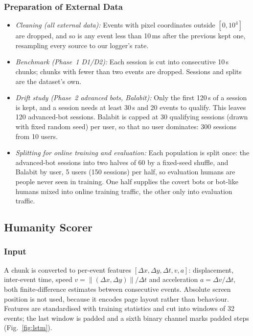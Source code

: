 \documentclass{ieeetj}
\begin{document}
\subsubsection{Preparation of External Data}
\begin{itemize}[leftmargin=*, itemsep=1pt]
\item \emph{Cleaning (all external data):} Events with pixel coordinates outside $[0,10^4]$ are dropped, and so is any event less than 10\,ms after the previous kept one, resampling every source to our logger's rate.
\item \emph{Benchmark (Phase~1 D1/D2):} Each session is cut into consecutive 10\,s chunks; chunks with fewer than two events are dropped. Sessions and splits are the dataset's own.
\item \emph{Drift study (Phase~2 advanced bots, Balabit):} Only the first 120\,s of a session is kept, and a session needs at least 30\,s and 20 events to qualify. This leaves 120 advanced-bot sessions. Balabit is capped at 30 qualifying sessions (drawn with fixed random seed) per user, so that no user dominates: 300 sessions from 10 users.
\item \emph{Splitting for online training and evaluation:} Each population is split once: the advanced-bot sessions into two halves of 60 by a fixed-seed shuffle, and Balabit by user, 5 users (150 sessions) per half, so evaluation humans are people never seen in training. One half supplies the covert bots or bot-like humans mixed into online training traffic, the other only into evaluation traffic.
\end{itemize}


\vspace{-5pt}
\subsection{Humanity Scorer}
\label{sec:scorer}
\subsubsection{Input}
A chunk is converted to per-event features $[\Delta x, \Delta y, \Delta t, v, a]$: displacement, inter-event time, speed $v=\lVert(\Delta x,\Delta y)\rVert/\Delta t$ and acceleration $a=\Delta v/\Delta t$, both finite-difference estimates between consecutive events. Absolute screen position is not used, because it encodes page layout rather than behaviour. Features are standardised with training statistics and cut into windows of 32 events; the last window is padded and a sixth binary channel marks padded steps (Fig.~\ref{fig:lstm}).
\end{document}

